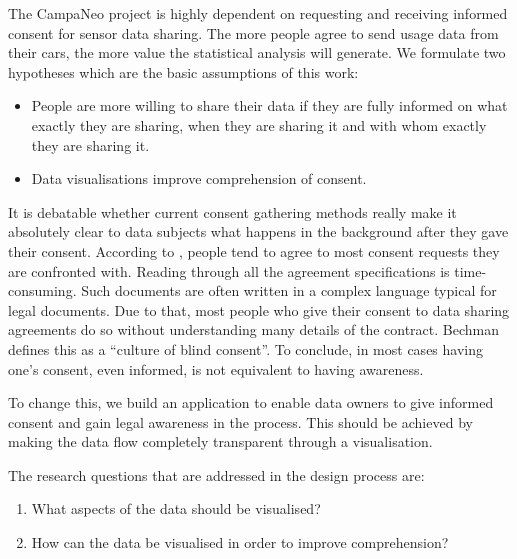 \documentclass[../paper.tex]{subfiles}
\begin{document}
  The CampaNeo project is highly dependent on requesting and receiving informed
  consent for sensor data sharing. The more people agree to send usage data from
  their cars, the more value the statistical analysis will generate. We
  formulate two hypotheses which are the basic assumptions of this work:

  \begin{itemize}
    \item People are more willing to share their data if they are fully informed
          on what exactly they are sharing, when they are sharing it and with
          whom exactly they are sharing it.
    \item Data visualisations improve comprehension of consent.
  \end{itemize}

  It is debatable whether current consent gathering methods really make it
  absolutely clear to data subjects what happens in the background after they
  gave their consent. According to \cite{Borgesisus_informed_consent_2015}, people
  tend to agree to most consent requests they are confronted with.
  Reading through all the agreement specifications is time-consuming. Such
  documents are often written in a complex language typical for legal documents.
  Due to that, most people who give their consent to data sharing agreements do so
  without understanding many details of the contract. Bechman \cite{Bechmann2014}
  defines this as a “culture of blind consent”. To conclude, in most cases having
  one’s consent, even informed, is not equivalent to having awareness.

  To change this, we build an application to enable data owners to give informed
  consent and gain legal awareness in the process. This should be achieved by
  making the data flow completely transparent through a visualisation.

  The research questions that are addressed in the design process are:

  \begin{enumerate}
    \item What aspects of the data should be visualised?
    \item How can the data be visualised in order to improve comprehension?
  \end{enumerate}
\end{document}
